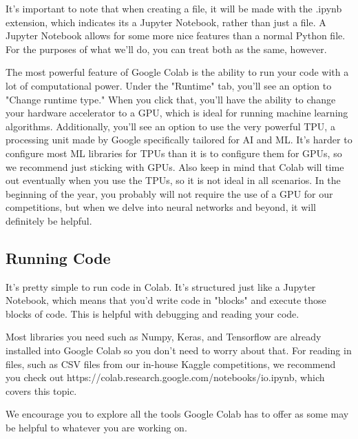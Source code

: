 \documentclass{article}
\begin{document}
It's important to note that when creating a file, it will be made with the .ipynb extension, which indicates its a Jupyter Notebook, rather than just a file. A Jupyter Notebook allows for some more nice features than a normal Python file. For the purposes of what we'll do, you can treat both as the same, however.

The most powerful feature of Google Colab is the ability to run your code with a lot of computational power. Under the "Runtime" tab, you'll see an option to "Change runtime type." When you click that, you'll have the ability to change your hardware accelerator to a GPU, which is ideal for running machine learning algorithms. Additionally, you'll see an option to use the very powerful TPU, a  processing unit made by Google specifically tailored for AI and ML. It's harder to configure most ML libraries for TPUs than it is to configure them for GPUs, so we recommend just sticking with GPUs. Also keep in mind that Colab will time out eventually when you use the TPUs, so it is not ideal in all scenarios. In the beginning of the year, you probably will not require the use of a GPU for our competitions, but when we delve into neural networks and beyond, it will definitely be helpful.

\subsection{Running Code}

It's pretty simple to run code in Colab. It's structured just like a Jupyter Notebook, which means that you'd write code in "blocks" and execute those blocks of code. This is helpful with debugging and reading your code.

Most libraries you need such as Numpy, Keras, and Tensorflow are already installed into Google Colab so you don't need to worry about that. For reading in files, such as CSV files from our in-house Kaggle competitions, we recommend you check out https://colab.research.google.com/notebooks/io.ipynb, which covers this topic.

We encourage you to explore all the tools Google Colab has to offer as some may be helpful to whatever you are working on.  
\end{document}
